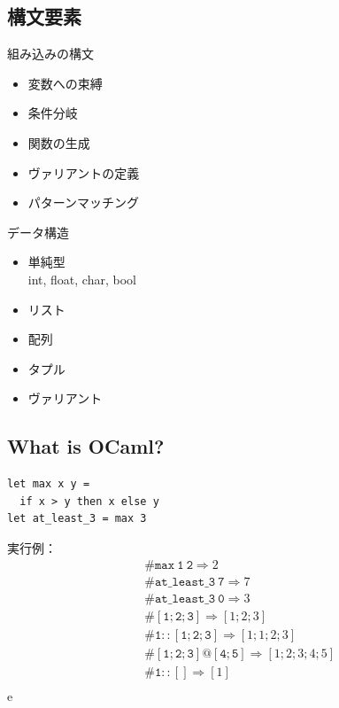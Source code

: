\documentclass[papersize,30pt,slide]{jsarticle}
\begin{document}
\subsection{構文要素}
\begin{multicols}{2}

組み込みの構文 %
\begin{itemize}
\item 変数への束縛 
\item 条件分岐
\item 関数の生成
\item ヴァリアントの定義
\item パターンマッチング
\end{itemize} %

データ構造 %
\begin{itemize}
\item 単純型 \\ int, float, char, bool
\item リスト
\item 配列
\item タプル
\item ヴァリアント
\end{itemize}
\end{multicols}

\newpage
\subsection{What is OCaml?}
\begin{verbatim}
let max x y =
  if x > y then x else y
let at_least_3 = max 3
\end{verbatim}
{
実行例：\vspace{-20pt}
\begin{eqnarray*}
&&\mathtt{\# max~1~2} \Longrightarrow 2\\
&&\mathtt{\# at\_least\_3~7} \Longrightarrow 7\\
&&\mathtt{\# at\_least\_3~0} \Longrightarrow 3\\
&&\mathtt{\# [1; 2; 3]} \Longrightarrow [1; 2; 3]\\
&&\mathtt{\# 1 :: [1; 2; 3]} \Longrightarrow [1; 1; 2; 3]\\
&&\mathtt{\# [1; 2; 3] @ [4; 5]} \Longrightarrow [1; 2; 3; 4; 5]\\
&&\mathtt{\# 1 :: []} \Longrightarrow [1]\\
\end{eqnarray*}e
\newpage
}
\end{document}
